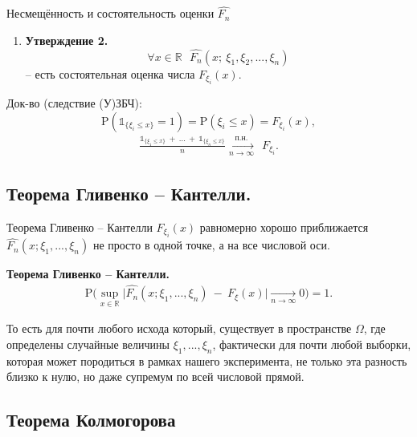 \begin{frame}{Несмещённость и состоятельность оценки $\hat{F_n}$}
\begin{enumerate}[2]
    \item 
    \textbf{Утверждение 2.~~}
$$\forall x \in  \mathbb{R} ~~~\hat{F_n}(x;~ \xi_1,\xi_2,...,\xi_n)$$ --
есть
состоятельная оценка числа $F_{\xi_i}(x)$.
\end{enumerate}
Док-во (следствие (У)ЗБЧ):
$$
\mathrm{P} ( \mathds {1}_{ \{\xi_i \leqslant x\} }=1 ) =
\mathrm{P} ( \xi_i \leqslant x ) = F_{\xi_i} (x),
$$
\begin{align*}
\frac{ 
\mathds{1}_{ \{\xi_1 \leqslant x\} }
 ~ + ~...~+~
 \mathds{1}_{ \{\xi_n \leqslant x\} }
}
{n}
\xrightarrow[n \to \infty]{\text{п.н.}}
~~F_{\xi_i}.
\end{align*}

\end{frame}{}


\subsection{Теорема Гливенко – Кантелли.}


\begin{frame}{Теорема Гливенко – Кантелли}
$F_{\xi_i}(x)$ равномерно хорошо приближается $\hat{F_n}(x; \xi_1,...,\xi_n)$ не просто в одной точке, а на все числовой оси.

\begin{theorem}
\textbf{Теорема Гливенко -- Кантелли.}
\begin{eqnarray*}
    \mathrm{P}\bigg( \sup_{x \in  \mathbb{R}} 
    \big| \hat{F_n}(x; \xi_1,...,\xi_n) ~-~ F_{\xi}(x) \big|
    \xrightarrow[n \to \infty]{ } 0
    \bigg) =1.
\end{eqnarray*}
\end{theorem}
То есть для почти любого исхода который,
существует  в  пространстве $\Omega$, где определены  случайные величины $\xi_1,...,\xi_n$, фактически для почти любой
выборки, которая может породиться в рамках нашего эксперимента, не только эта разность близко к нулю, но даже супремум по всей
числовой
прямой.
\end{frame}

\subsection{Теорема Колмогорова}

